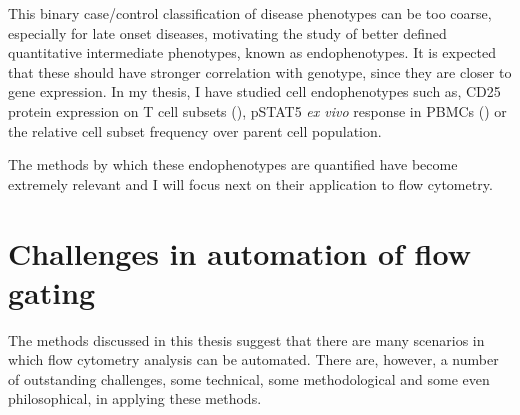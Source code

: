 This binary case/control classification of disease phenotypes can be too coarse, especially for late onset diseases, motivating the study of better defined quantitative intermediate phenotypes, known as endophenotypes.
It is expected that these should have stronger correlation with genotype, since they are closer to gene expression.
In my thesis, I have studied cell endophenotypes such as, CD25 protein expression on T cell subsets (), pSTAT5 \textit{ex vivo} response in \glspl{PBMC} () or the relative cell subset frequency over parent cell population.

The methods by which these endophenotypes are quantified have become extremely relevant and I will focus next on their application to flow cytometry.



\section{ Challenges in automation of flow gating }

The methods discussed in this thesis suggest that there are many scenarios in which flow cytometry analysis can be automated.
There are, however, a number of outstanding challenges, some technical, some methodological and some even philosophical, in applying these methods.


